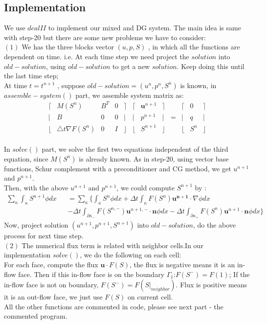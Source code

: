 \documentclass[12pt]{article}
\begin{document}
\subsection{Implementation}
We use
$dealII$ to implement our mixed and DG system. The main idea is same
with step-20 but there are some new problems we have to consider:\\
\indent $(1)$ We has the three blocks vector $(u,p,S)$ , in which
all the functions are dependent on time. i.e. At each time step we
need project the $solution$ into $old-solution$, using
$old-solution$ to get a new $solution$.
Keep doing this until the last time step;\\
At time $t=t^{n+1}$ , suppose $old-solution=(u^{n},p^{n},S^{n})$ is
known, in $assemble-system()$ part, we assemble system matrix as:
\[
\begin {array}{cccccccccccc}
\lceil &M(S^{n}) &B^{T}& 0 &\rceil & \lceil& \mathbf{u}^{n+1}&\rceil& &\lceil& 0 &\rceil\\
|      &B&    0 & 0 & |     &|      & p^{n+1} &|        &=&|     & q &|\\
\lfloor&\triangle t \nabla F(S^n)&    0& I & \rfloor & \lfloor
&S^{n+1} & \rfloor & & \lfloor& S^{n}& \rfloor
\end {array}
\]
\\
In $solve()$ part, we solve the first two equations independent of
the third equation, since $M( S^n)$ is already known. As in step-20,
using vector base functions, Schur complement with a
preconditioner and CG method, we get $u^{n+1}$and $p^{n+1}$. \\
Then, with the above $u^{n+1}$ and $p^{n+1}$, we could compute
$S^{n+1}$ by :
\begin {eqnarray}
\sum_{\kappa}\int_{\kappa}S^{n+1} \phi dx&&=
\sum_{\kappa}\{\int_{\kappa} S^{n} \phi dx+\Delta t\int_{\kappa}
F(S^{n}) \mathbf{u^{n+1}}\cdot \nabla \phi dx\\
\nonumber && -\Delta t \int_{\partial \kappa_{-}}F(S^{n,-})
\mathbf{u}^{n+1,-}\cdot \mathbf{n} \phi dx -\Delta t \int_{\partial
\kappa_{+}}F(S^{n}) \mathbf{u}^{n+1}\cdot \mathbf{n} \phi dx\}
\end {eqnarray}
Now, project solution $(u^{n+1},p^{n+1},S^{n+1})$ into
$old-solution$, do the above process for next time step.\\
 \indent
$(2)$ The numerical flux term is related with neighbor cells.In our
implementation $solve( )$, we do the following on each cell: \\
For each face, compute the flux $\mathbf{u}\cdot F(S)$, the flux is
negative means it is an in-flow face. Then if this in-flow face is
on the boundary $\Gamma_{1}$:$F(S^{-})=F(1)$; If the in-flow
face is not on boundary, $F(S^{-})=F(S|_{neighbor})$.
Flux is positive means it is an out-flow face, we just use $ F(S)$ on current cell.\\
All the other functions are commented in code, please see next part
- the commented program.
\end{document}
